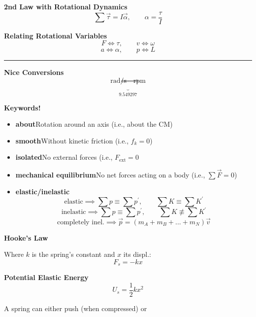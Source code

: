 \documentclass[	DIV=calc,%
							paper=a4,%
							fontsize=11pt,%
							twocolumn]{scrartcl} %
\newcommand{\hformbar}[1]{\vspace{5pt}\hrule\vspace{10pt}} %
\newcommand{\formdesc}[1]{\noindent\textbf{#1}}
\begin{document}
\textbf{2nd Law with Rotational Dynamics}
\begin{equation}
    \sum\vec\tau=I\vec\alpha,\qquad\alpha=\frac{\tau}{I}
\end{equation}

\textbf{Relating Rotational Variables}
    $$F\iff\tau,\qquad  v\iff\omega$$
    $$a\iff\alpha,\qquad p\iff L$$
\hformbar{}

\sethlcolor{pink}{\formdesc{\hl{Misc.}}}

\textbf{Nice Conversions}
\begin{equation}
    \underbrace{\text{rad/s}\iff\text{rpm}}_{9.549297}
\end{equation}

\textbf{Keywords!}
\begin{itemize}
    \item \textbf{about}\newline\qquad Rotation around an axis (i.e., about the CM)
    \item \textbf{smooth}\newline\qquad Without kinetic friction (i.e., $f_k=0$)
    \item \textbf{isolated}\newline\qquad No external forces (i.e., $F_\text{ext}=0$
    \item \textbf{mechanical equilibrium}\newline\qquad No net forces acting on a body (i.e., $\sum\vec F=0$)
    \item \textbf{elastic/inelastic}\newline\qquad $$\text{elastic}\implies\sum p\equiv\sum p^\prime,\qquad\sum K\equiv\sum K^\prime$$
    $$\text{inelastic}\implies\sum p\equiv\sum p^\prime,\qquad\sum K\not\equiv\sum K^\prime$$
    $$\text{completely inel.}\implies\vec p=(m_A+m_B+...+m_N)\vec v$$
\end{itemize}

\textbf{Hooke's Law}

Where $k$ is the spring's constant and $x$ its displ.:
\begin{equation}
    F_s = -kx
\end{equation}

\textbf{Potential Elastic Energy}
\begin{equation}
    U_s=\frac{1}{2}kx^2
\end{equation}

A spring can either push (when compressed) or 
\end{document}
